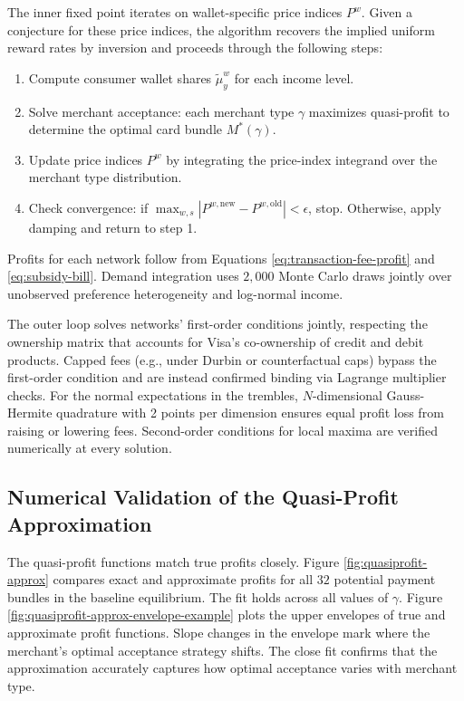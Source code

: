\documentclass[main.tex]{subfiles}
\begin{document}
The inner fixed point iterates on wallet-specific price indices $P^w$.
Given a conjecture for these price indices, the algorithm recovers the implied uniform reward rates by inversion and proceeds through the following steps:
\begin{enumerate}
    \item Compute consumer wallet shares $\tilde{\mu}^w_y$ for each income level.
    \item Solve merchant acceptance: each merchant type $\gamma$ maximizes quasi-profit to determine the optimal card bundle $M^*(\gamma)$.
    \item Update price indices $P^w$ by integrating the price-index integrand over the merchant type distribution.
    \item Check convergence: if $\max_{w,s} |P^{w,\text{new}} - P^{w,\text{old}}| < \epsilon$, stop. Otherwise, apply damping and return to step 1.
\end{enumerate}
Profits for each network follow from Equations \ref{eq:transaction-fee-profit} and \ref{eq:subsidy-bill}.
Demand integration uses $2{,}000$ Monte Carlo draws jointly over unobserved preference heterogeneity and log-normal income.

The outer loop solves networks' first-order conditions jointly, respecting the ownership matrix that accounts for Visa's co-ownership of credit and debit products.
Capped fees (e.g., under Durbin or counterfactual caps) bypass the first-order condition and are instead confirmed binding via Lagrange multiplier checks.
For the normal expectations in the trembles, $N$-dimensional Gauss-Hermite quadrature with 2 points per dimension ensures equal profit loss from raising or lowering fees.
Second-order conditions for local maxima are verified numerically at every solution.

\subsection{Numerical Validation of the Quasi-Profit Approximation}
\label{subsec:oa-quasiprofit-validation}

The quasi-profit functions match true profits closely.
Figure \ref{fig:quasiprofit-approx} compares exact and approximate profits for all $32$ potential payment bundles in the baseline equilibrium.
The fit holds across all values of $\gamma$.
Figure \ref{fig:quasiprofit-approx-envelope-example} plots the upper envelopes of true and approximate profit functions.
Slope changes in the envelope mark where the merchant's optimal acceptance strategy shifts.
The close fit confirms that the approximation accurately captures how optimal acceptance varies with merchant type.
\end{document}
